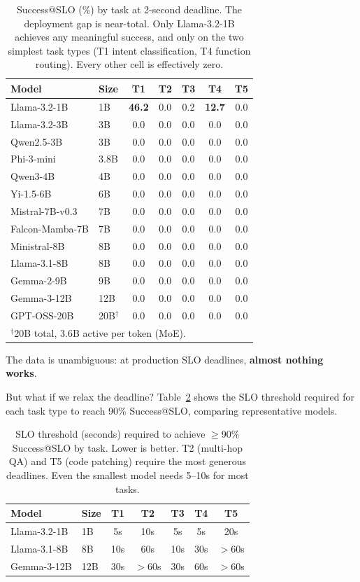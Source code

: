 \documentclass[11pt]{article}
\begin{document}
\begin{table}[t]
\centering
\caption{Success@SLO (\%) by task at 2-second deadline. The deployment gap is near-total. Only Llama-3.2-1B achieves any meaningful success, and only on the two simplest task types (T1 intent classification, T4 function routing). Every other cell is effectively zero.}
\label{tab:per-task}
\small
\begin{tabular}{llccccc}
\toprule
\textbf{Model} & \textbf{Size} & \textbf{T1} & \textbf{T2} & \textbf{T3} & \textbf{T4} & \textbf{T5} \\
\midrule
Llama-3.2-1B & 1B & \textbf{46.2} & 0.0 & 0.2 & \textbf{12.7} & 0.0 \\
Llama-3.2-3B & 3B & 0.0 & 0.0 & 0.0 & 0.0 & 0.0 \\
Qwen2.5-3B & 3B & 0.0 & 0.0 & 0.0 & 0.0 & 0.0 \\
Phi-3-mini & 3.8B & 0.0 & 0.0 & 0.0 & 0.0 & 0.0 \\
Qwen3-4B & 4B & 0.0 & 0.0 & 0.0 & 0.0 & 0.0 \\
Yi-1.5-6B & 6B & 0.0 & 0.0 & 0.0 & 0.0 & 0.0 \\
Mistral-7B-v0.3 & 7B & 0.0 & 0.0 & 0.0 & 0.0 & 0.0 \\
Falcon-Mamba-7B & 7B & 0.0 & 0.0 & 0.0 & 0.0 & 0.0 \\
Ministral-8B & 8B & 0.0 & 0.0 & 0.0 & 0.0 & 0.0 \\
Llama-3.1-8B & 8B & 0.0 & 0.0 & 0.0 & 0.0 & 0.0 \\
Gemma-2-9B & 9B & 0.0 & 0.0 & 0.0 & 0.0 & 0.0 \\
Gemma-3-12B & 12B & 0.0 & 0.0 & 0.0 & 0.0 & 0.0 \\
GPT-OSS-20B & 20B$^\dagger$ & 0.0 & 0.0 & 0.0 & 0.0 & 0.0 \\
\bottomrule
\multicolumn{7}{l}{\footnotesize $^\dagger$20B total, 3.6B active per token (MoE).}
\end{tabular}
\end{table}

The data is unambiguous: at production SLO deadlines, \textbf{almost nothing works}.

But what if we relax the deadline? Table~\ref{tab:slo-threshold} shows the SLO threshold required for each task type to reach 90\% Success@SLO, comparing representative models.

\begin{table}[t]
\centering
\caption{SLO threshold (seconds) required to achieve $\geq$90\% Success@SLO by task. Lower is better. T2 (multi-hop QA) and T5 (code patching) require the most generous deadlines. Even the smallest model needs 5--10s for most tasks.}
\label{tab:slo-threshold}
\small
\begin{tabular}{llccccc}
\toprule
\textbf{Model} & \textbf{Size} & \textbf{T1} & \textbf{T2} & \textbf{T3} & \textbf{T4} & \textbf{T5} \\
\midrule
Llama-3.2-1B & 1B & 5s & 10s & 5s & 5s & 20s \\
Llama-3.1-8B & 8B & 10s & 60s & 10s & 30s & $>$60s \\
Gemma-3-12B & 12B & 30s & $>$60s & 30s & 60s & $>$60s \\
\bottomrule
\end{tabular}
\end{table}
\end{document}
